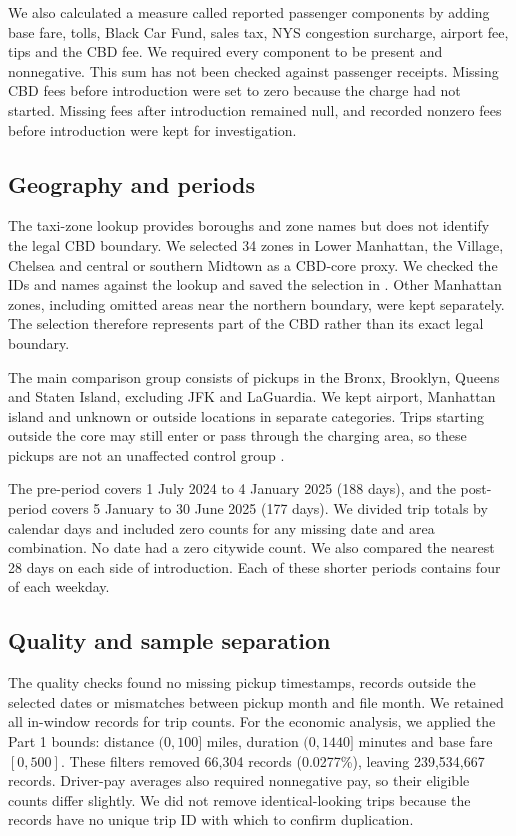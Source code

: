 \documentclass[10pt,a4paper]{article}
\newcommand{\field}[1]{\texttt{\detokenize{#1}}}
\begin{document}
We also calculated a measure called reported passenger components by adding base fare, tolls, Black Car Fund, sales tax, NYS congestion surcharge, airport fee, tips and the CBD fee. We required every component to be present and nonnegative. This sum has not been checked against passenger receipts. Missing CBD fees before introduction were set to zero because the charge had not started. Missing fees after introduction remained null, and recorded nonzero fees before introduction were kept for investigation.

\subsection{Geography and periods}

The taxi-zone lookup provides boroughs and zone names but does not identify the legal CBD boundary. We selected 34 zones in Lower Manhattan, the Village, Chelsea and central or southern Midtown as a CBD-core proxy. We checked the IDs and names against the lookup and saved the selection in \field{zone_definition.csv}. Other Manhattan zones, including omitted areas near the northern boundary, were kept separately. The selection therefore represents part of the CBD rather than its exact legal boundary.

The main comparison group consists of pickups in the Bronx, Brooklyn, Queens and Staten Island, excluding JFK and LaGuardia. We kept airport, Manhattan island and unknown or outside locations in separate categories. Trips starting outside the core may still enter or pass through the charging area, so these pickups are not an unaffected control group \cite{mta}.

The pre-period covers 1 July 2024 to 4 January 2025 (188 days), and the post-period covers 5 January to 30 June 2025 (177 days). We divided trip totals by calendar days and included zero counts for any missing date and area combination. No date had a zero citywide count. We also compared the nearest 28 days on each side of introduction. Each of these shorter periods contains four of each weekday.

\subsection{Quality and sample separation}

The quality checks found no missing pickup timestamps, records outside the selected dates or mismatches between pickup month and file month. We retained all in-window records for trip counts. For the economic analysis, we applied the Part 1 bounds: distance $(0,100]$ miles, duration $(0,1440]$ minutes and base fare $[0,500]$. These filters removed 66,304 records (0.0277\%), leaving 239,534,667 records. Driver-pay averages also required nonnegative pay, so their eligible counts differ slightly. We did not remove identical-looking trips because the records have no unique trip ID with which to confirm duplication.
\end{document}
